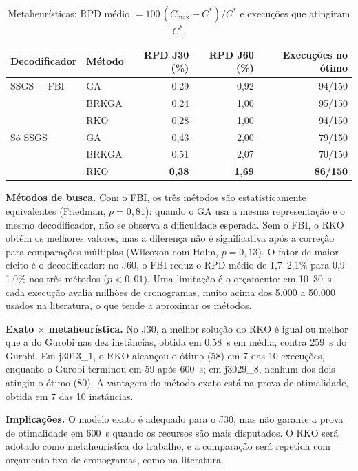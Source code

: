 \documentclass[11pt,a4paper]{article}
\newcommand{\cmax}{C_{\max}}
\begin{document}
\begin{table}[ht]
\centering
\small
\caption{Metaheurísticas: RPD médio $= 100\,(\cmax - C^*)/C^*$ e execuções que atingiram $C^*$.}
\label{tab:mh}
\begin{tabular}{llrrr}
\toprule
Decodificador & Método & RPD J30 (\%) & RPD J60 (\%) & Execuções no ótimo \\
\midrule
SSGS + FBI & GA    & 0,29 & 0,92 & 94/150 \\
           & BRKGA & 0,24 & 1,00 & 95/150 \\
           & RKO   & 0,28 & 1,00 & 94/150 \\
\midrule
Só SSGS    & GA    & 0,43 & 2,00 & 79/150 \\
           & BRKGA & 0,51 & 2,07 & 70/150 \\
           & RKO   & \textbf{0,38} & \textbf{1,69} & \textbf{86/150} \\
\bottomrule
\end{tabular}
\end{table}

\vspace{-0.4em}
\textbf{Métodos de busca.} Com o FBI, os três métodos são estatisticamente equivalentes
(Friedman, $p = 0{,}81$): quando o GA usa a mesma representação e o mesmo decodificador, não se
observa a dificuldade esperada. Sem o FBI, o RKO obtém os melhores valores, mas a diferença não é
significativa após a correção para comparações múltiplas (Wilcoxon com Holm, $p = 0{,}13$). O fator
de maior efeito é o decodificador: no J60, o FBI reduz o RPD médio de 1,7--2,1\% para 0,9--1,0\% nos três
métodos ($p < 0{,}01$). Uma limitação é o orçamento: em 10--30~s cada execução avalia milhões de
cronogramas, muito acima dos 5.000 a 50.000 usados na literatura, o que tende a aproximar os métodos.

\textbf{Exato $\times$ metaheurística.} No J30, a melhor solução do RKO é igual ou melhor que a do
Gurobi nas dez instâncias, obtida em 0,58~s em média, contra 259~s do Gurobi. Em j3013\_1, o RKO
alcançou o ótimo (58) em 7 das 10 execuções, enquanto o Gurobi terminou em 59 após 600~s; em
j3029\_8, nenhum dos dois atingiu o ótimo (80). A vantagem do método exato está na prova de
otimalidade, obtida em 7 das 10 instâncias.

\textbf{Implicações.} O modelo exato é adequado para o J30, mas não garante a prova de otimalidade
em 600~s quando os recursos são mais disputados. O RKO será adotado como metaheurística do trabalho,
e a comparação será repetida com orçamento fixo de cronogramas, como na literatura.
\end{document}
